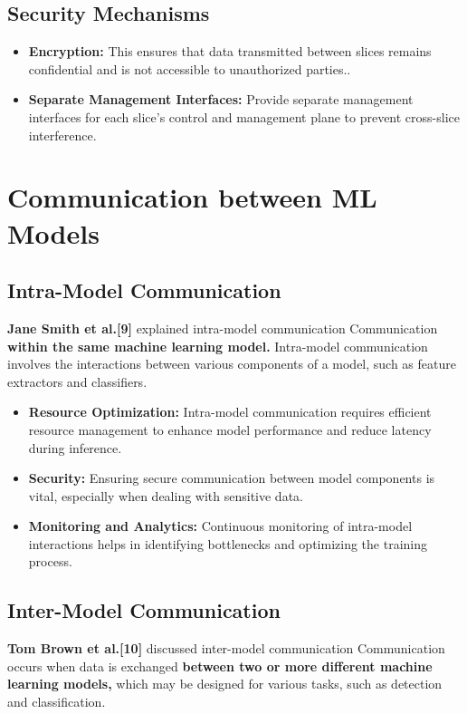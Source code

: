 \documentclass[oneside,a4paper,12pt]{report}
\begin{document}
\subsection{Security Mechanisms }
\begin{itemize}
\item \textbf{Encryption:} This ensures that data transmitted between slices remains confidential and is not accessible to unauthorized parties..
\item \textbf{Separate Management Interfaces:} Provide separate management interfaces for each slice’s control and management plane to prevent cross-slice interference.
\end{itemize}

\section{Communication between ML Models}
\subsection{Intra-Model Communication}
\textbf{Jane Smith et al.[9]} explained intra-model communication 
\vspace*{1\baselineskip}
\newline Communication \textbf{within the same machine learning model.} Intra-model communication involves the interactions between various components of a model, such as feature extractors and classifiers.

\begin{itemize}
    \item \textbf{Resource Optimization:} Intra-model communication requires efficient resource management to enhance model performance and reduce latency during inference.
    \item \textbf{Security:} Ensuring secure communication between model components is vital, especially when dealing with sensitive data.
    \item \textbf{Monitoring and Analytics:} Continuous monitoring of intra-model interactions helps in identifying bottlenecks and optimizing the training process.
\end{itemize}

\subsection{Inter-Model Communication}
\textbf{Tom Brown et al.[10]} discussed inter-model communication 
\vspace*{1\baselineskip}
\newline Communication occurs when data is exchanged \textbf{between two or more different machine learning models,} which may be designed for various tasks, such as detection and classification.
\end{document}
